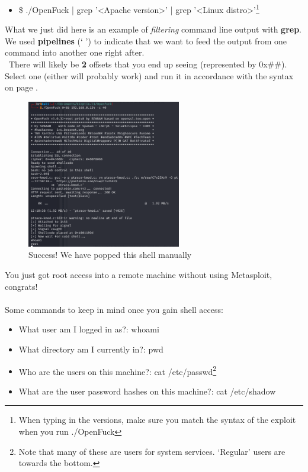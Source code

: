 \documentclass[a4paper,11pt]{article}
\renewcommand{\tt}[2][tt]{\textcolor{#1}{\ttfamily #2}}%
\begin{document}
\begin{itemize}
    \item \tt{\$ ./OpenFuck | grep '<Apache version>' | grep '<Linux distro>'}\footnote[2]{When typing in the versions, make sure you match the syntax of the exploit when you run \tt{./OpenFuck}}
\end{itemize}
What we just did here is an example of \textit{filtering} command line output with {\bfseries grep}. We used {\bfseries pipelines} (` \textpipe ') to indicate that we want to feed the output from one command into another one right after.
\\
\
There will likely be {\bfseries 2} offsets that you end up seeing (represented by 0x\#\#). Select one (either will probably work) and run it in accordance with the syntax on page \pageref{fig:gcctrans2open}.

\begin{figure}[h]
    \centering
    \includegraphics[width=0.6\textwidth]{images/manualtrans2open.png}
    \caption{Success! We have popped this shell manually }
    \label{fig:manualtrans2open}
\end{figure}

You just got root access into a remote machine without using Metasploit, congrats!
\\
\\
Some commands to keep in mind once you gain shell access:
\begin{itemize}
    \item What user am I logged in as?: \tt{whoami}
    \item What directory am I currently in?: \tt{pwd}
    \item Who are the users on this machine?: \tt{cat /etc/passwd}\footnote[1]{Note that many of these are users for system services. `Regular' users are towards the bottom.}
    \item What are the user password hashes on this machine?: \tt{cat /etc/shadow}
\end{itemize}
\pagebreak
\end{document}
